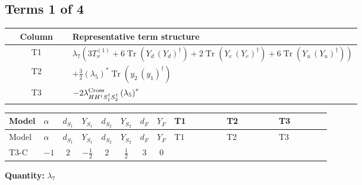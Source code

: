 \documentclass[8pt]{article}
\begin{document}
\begin{landscape}
\subsection*{Terms 1 of 4}
\begin{center}
\begin{tabular}{@{}c >{\raggedright\arraybackslash}p{0.82\linewidth}@{}}
\toprule
Column & Representative term structure \\
\midrule
T1 & \(\displaystyle {\lambda_{7}} (3 T_{\nu}^{(1)}+6 \operatorname{Tr}\!\left({Y_d}\,\left({Y_d}\right)^{\dagger}\right)+2 \operatorname{Tr}\!\left({Y_e}\,\left({Y_e}\right)^{\dagger}\right)+6 \operatorname{Tr}\!\left({Y_u}\,\left({Y_u}\right)^{\dagger}\right))\) \\
\midrule
T2 & \(\displaystyle +\frac{3}{2} \left({\lambda_5}\right)^{*} \operatorname{Tr}\!\left({y_2}\,\left({y_1}\right)^{\dagger}\right)\) \\
\midrule
T3 & \(\displaystyle -2 {\lambda_{H H^\dagger S_1^\dagger S_2^\dagger}^{\rm Cross}} \left({\lambda_5}\right)^{*}\) \\
\midrule
\bottomrule
\end{tabular}
\end{center}
\smallskip
\tiny
\begin{longtable}{@{}llcccccc >{\raggedright\arraybackslash}p{0.21\linewidth} >{\raggedright\arraybackslash}p{0.21\linewidth} >{\raggedright\arraybackslash}p{0.21\linewidth}@{}}
\toprule
Model & $\alpha$ & $d_{S_1}$ & $Y_{S_1}$ & $d_{S_2}$ & $Y_{S_2}$ & $d_F$ & $Y_F$ & T1 & T2 & T3 \\
\midrule
\endfirsthead
\toprule
Model & $\alpha$ & $d_{S_1}$ & $Y_{S_1}$ & $d_{S_2}$ & $Y_{S_2}$ & $d_F$ & $Y_F$ & T1 & T2 & T3 \\
\midrule
\endhead
T3-C & $-1$ & $2$ & $-\frac{1}{2}$ & $2$ & $\frac{1}{2}$ & $3$ & $0$ & \scriptsize\adjustbox{max width=\linewidth}{$\begin{gathered} {\lambda_{7}} (3 T_{\nu}^{(1)}+6 \operatorname{Tr}\!\left({Y_d}\,\left({Y_d}\right)^{\dagger}\right)+2 \operatorname{Tr}\!\left({Y_e}\,\left({Y_e}\right)^{\dagger}\right)+6 \operatorname{Tr}\!\left({Y_u}\,\left({Y_u}\right)^{\dagger}\right))\end{gathered}$} & \scriptsize\adjustbox{max width=\linewidth}{$\begin{gathered} +\frac{3}{2} \left({\lambda_5}\right)^{*} \operatorname{Tr}\!\left({y_2}\,\left({y_1}\right)^{\dagger}\right)\end{gathered}$} & \scriptsize\adjustbox{max width=\linewidth}{$\begin{gathered} -2 {\lambda_{H H^\dagger S_1^\dagger S_2^\dagger}^{\rm Cross}} \left({\lambda_5}\right)^{*}\end{gathered}$} \\
\midrule
\bottomrule
\end{longtable}
\clearpage
\noindent\textbf{Quantity: }$\lambda_{7}$\par\smallskip

\end{landscape}
\end{document}
